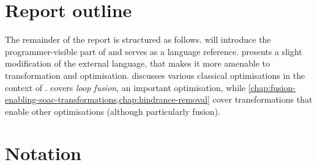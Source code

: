 \begin{quote}
\end{quote}

\section{Report outline}

The remainder of the report is structured as follows.
 will introduce the
programmer-visible part of \LO{} and serves as a language reference.
 presents a slight modification of the external
language, that makes it more amenable to transformation and
optimisation.   discusses various
classical optimisations in the context of \LO{}.  
covers \textit{loop fusion}, an important optimisation, while
\cref{chap:fusion-enabling-soac-transformations,chap:hindrance-removal}
cover transformations that enable other optimisations (although
particularly fusion).

\section{Notation}

